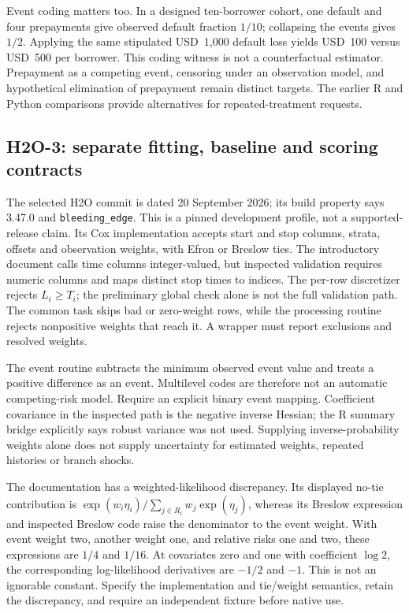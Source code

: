 Event coding matters too. In a designed ten-borrower cohort, one default and
four prepayments give observed default fraction $1/10$; collapsing the events
gives $1/2$. Applying the same stipulated USD~1,000 default loss yields
USD~100 versus USD~500 per borrower. This coding witness is not a
counterfactual estimator. Prepayment as a competing event, censoring under an
observation model, and hypothetical elimination of prepayment remain distinct
targets. The earlier R and Python comparisons provide alternatives for
repeated-treatment requests. \citep{exec24_longjava_reference}

\subsection{H2O-3: separate fitting, baseline and scoring contracts}
The selected H2O commit is dated 20 September 2026; its build property says
3.47.0 and \texttt{bleeding\_edge}. This is a pinned development profile,
not a supported-release claim. Its Cox implementation accepts start and stop
columns, strata, offsets and observation weights, with Efron or Breslow ties.
The introductory document calls time columns integer-valued, but inspected
validation requires numeric columns and maps distinct stop times to indices.
The per-row discretizer rejects $L_i\geq T_i$; the preliminary global check
alone is not the full validation path. The common task skips bad or
zero-weight rows, while the processing routine rejects nonpositive weights
that reach it. A wrapper must report exclusions and resolved weights.
\citep{exec24_longjava_h2o}

The event routine subtracts the minimum observed event value and treats a
positive difference as an event. Multilevel codes are therefore not an
automatic competing-risk model. Require an explicit binary event mapping.
Coefficient covariance in the inspected path is the negative inverse Hessian;
the R summary bridge explicitly says robust variance was not used. Supplying
inverse-probability weights alone does not supply uncertainty for estimated
weights, repeated histories or branch shocks. \citep{exec24_longjava_h2o}

The documentation has a weighted-likelihood discrepancy. Its displayed
no-tie contribution is $\exp(w_i\eta_i)/\sum_{j\in R_i}w_j\exp(\eta_j)$,
whereas its Breslow expression and inspected Breslow code raise the denominator
to the event weight. With event weight two, another weight one, and relative
risks one and two, these expressions are $1/4$ and $1/16$. At covariates zero
and one with coefficient $\log 2$, the corresponding log-likelihood
derivatives are $-1/2$ and $-1$. This is not an ignorable constant.
Specify the implementation and tie/weight semantics, retain the discrepancy,
and require an independent fixture before native use.
\citep{exec24_longjava_h2o,exec24_longjava_reference}

